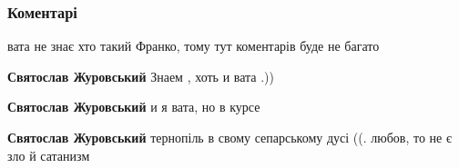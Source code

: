 
 
 
 
 
\subsubsection{Коментарі}
\label{sec:27_08_2021.fb.kocaba_ruslan.1.ivan_franko_165_let.cmt}

\begin{itemize}
 
вата не знає хто такий Франко, тому тут коментарів буде не багато \Smiley[1.0][yellow]

\begin{itemize}
 
\textbf{Святослав Журовський} Знаем , хоть и вата .))

 
\textbf{Святослав Журовський} и я вата, но в курсе

 
\textbf{Святослав Журовський} тернопіль в свому сепарському дусі ((. любов, то не є зло й сатанизм

 

\end{itemize}
\end{itemize}
